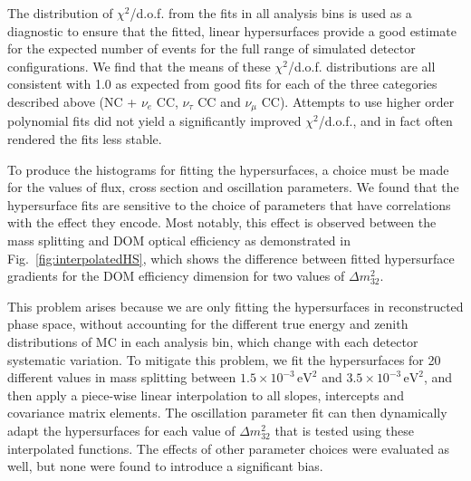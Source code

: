 
The distribution of $\chi^{2}$/d.o.f. from the fits in all analysis bins is used as a diagnostic to ensure that the fitted, linear hypersurfaces provide a good estimate for the expected number of events for the full range of simulated detector configurations. We find that the means of these $\chi^{2}$/d.o.f. distributions are all consistent with 1.0 as expected from good fits for each of the three categories described above (NC + $\nu_{e}$ CC, $\nu_{\tau}$ CC and $\nu_{\mu}$ CC). Attempts to use higher order polynomial fits did not yield a significantly improved $\chi^{2}$/d.o.f., and in fact often rendered the fits less stable. 

To produce the histograms for fitting the hypersurfaces, a choice must be made for the values of flux, cross section and oscillation parameters. We found that the hypersurface fits are sensitive to the choice of parameters that have correlations with the effect they encode. Most notably, this effect is observed between the mass splitting and DOM optical efficiency as demonstrated in Fig.~\ref{fig:interpolatedHS}, which shows the difference between fitted hypersurface gradients for the DOM efficiency dimension for two values of $\Delta m^{2}_{32}$. 

This problem arises because we are only fitting the hypersurfaces in reconstructed phase space, without accounting for the different true energy and zenith distributions of MC in each analysis bin, which change with each detector systematic variation. To mitigate this problem, we fit the hypersurfaces for 20 different values in mass splitting between $1.5\times 10^{-3}\,\mathrm{eV}^2$ and $3.5\times 10^{-3}\,\mathrm{eV}^2$, and then apply a piece-wise linear interpolation to all slopes, intercepts and covariance matrix elements. The oscillation parameter fit can then dynamically adapt the hypersurfaces for each value of $\Delta m^{2}_{32}$ that is tested using these interpolated functions. The effects of other parameter choices were evaluated as well, but none were found to introduce a significant bias.


